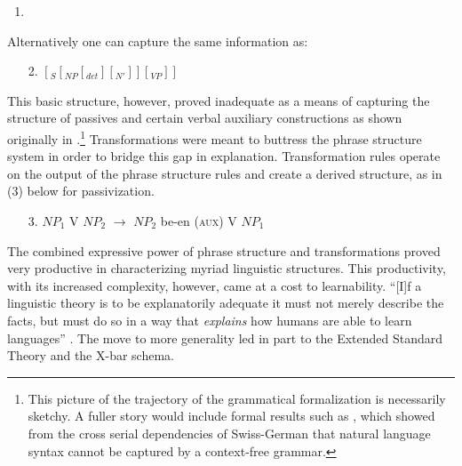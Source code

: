 \documentclass[output=paper]{langscibook}
\begin{document}
\begin{enumerate}
\item \leavevmode\vadjust{\vspace{-\baselineskip}}\newline
{}
\end{enumerate}

Alternatively one can capture the same information as:
\begin{enumerate}
    \item[2.] $[_S[_{NP}[_{det}][_{N'}]][_{VP}]]$
\end{enumerate} 

This basic structure, however, proved inadequate as a means of capturing the structure of passives and certain verbal auxiliary constructions as shown originally in \cite{Postal1964}.\footnote{This picture of the trajectory of the grammatical formalization is necessarily sketchy. A fuller story would include formal results such as \cite{Shieber1985}, which showed from the cross serial dependencies of Swiss-German that natural language syntax cannot be captured by a context-free grammar.} Transformations were meant to buttress the phrase structure system in order to bridge this gap in explanation. Transformation rules operate on the output of the phrase structure rules and create a derived structure, as in (3) below for passivization.

\begin{enumerate}
    \item[3.] $NP_1$ V $NP_2$ $\rightarrow$ $NP_2$ be-en (\textsc{aux}) V $NP_1$
\end{enumerate} 


The combined expressive power of phrase structure and transformations proved very productive in characterizing myriad linguistic structures.
This productivity, with its increased complexity, however, came at a cost to learnability. ``[I]f a linguistic theory is to be explanatorily adequate it must not merely describe the facts, but must do so in a way that \emph{explains} how humans are able to learn languages'' \citep[15]{Ludlow2011}. The move to more generality led in part to the Extended Standard Theory and the X-bar schema.   
\end{document}
